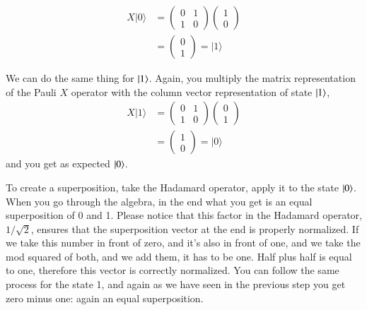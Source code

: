 \begin{equation}
\begin{aligned}
X|0\rangle &=\left(\begin{array}{ll}
0 & 1 \\
1 & 0
\end{array}\right)\left(\begin{array}{l}
1 \\
0
\end{array}\right) \\
&=\left(\begin{array}{l}
0 \\
1
\end{array}\right)=|1\rangle
\end{aligned}
\end{equation}


We can do the same thing for $\left| 1 \right\rangle$. Again, you multiply the matrix representation of the Pauli $X$ operator with the column vector representation of state $\left| 1 \right\rangle$,
\begin{equation}
\begin{aligned}
X|1\rangle &=\left(\begin{array}{ll}
0 & 1 \\
1 & 0
\end{array}\right)\left(\begin{array}{l}
0 \\
1
\end{array}\right) \\
&=\left(\begin{array}{l}
1 \\
0
\end{array}\right)=|0\rangle
\end{aligned}
\end{equation}
and you get as expected $\left| 0 \right\rangle$. 

To create a superposition, take the Hadamard operator, apply it to the state $\left| 0 \right\rangle$. When you go through the algebra, in the end what you get is an equal superposition of 0 and 1. Please notice that this factor in the Hadamard operator, $1/\sqrt{2}$, ensures that the superposition vector at the end is properly normalized. If we take this number in front of zero, and it's also in front of one, and we take the mod squared of both, and we add them, it has to be one. Half plus half is equal to one, therefore this vector is correctly normalized. You can follow the same process for the state 1, and again as we have seen in the previous step you get zero minus one: again an equal superposition.

